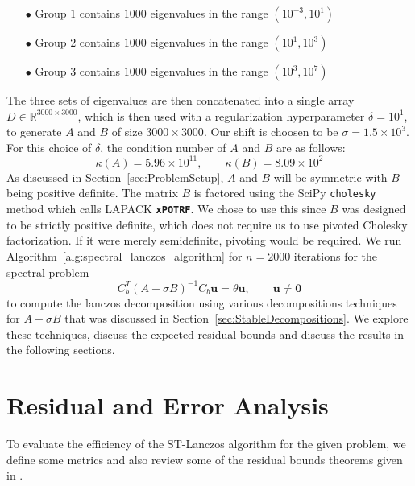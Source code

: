 \begin{itemize}
    \item[$\bullet$] Group $1$ contains $1000$ eigenvalues in the range $(10^{-3}, 10^{1})$
    \item[$\bullet$] Group $2$ contains $1000$ eigenvalues in the range $(10^1, 10^3)$
    \item[$\bullet$] Group $3$ contains $1000$ eigenvalues in the range $(10^3, 10^7)$
\end{itemize}

The three sets of eigenvalues are then concatenated into a single array $D \in \mathbb{R}^{3000 \times 3000}$, which is then used with a regularization hyperparameter $\delta = 10^{1}$, to generate $A$ and $B$ of size $3000 \times 3000$. Our shift is choosen to be $\sigma = 1.5 \times 10^3$. For this choice of $\delta$, the condition number of $A$ and $B$ are as follows:
\begin{equation*}
    \kappa(A) = 5.96 \times 10^{11}, \qquad \kappa(B) = 8.09 \times 10^2
\end{equation*}
As discussed in Section~\ref{sec:ProblemSetup}, $A$ and $B$ will be symmetric with $B$ being positive definite. The matrix $B$ is factored using the SciPy \texttt{cholesky} method which calls LAPACK \textbf{\texttt{xPOTRF}}. We chose to use this since $B$ was designed to be strictly positive definite, which does not require us to use  pivoted Cholesky factorization. If it were merely semidefinite, pivoting would be required. We run Algorithm~\ref{alg:spectral_lanczos_algorithm} for $n=2000$ iterations for the spectral problem
\begin{equation}\label{eq:ShiftedInvertedProblem2}
	C_b^T (A-\sigma B)^{-1} C_b \mathbf{u} = \theta \mathbf{u}, \qquad \mathbf{u} \neq \mathbf{0}
\end{equation}
to compute the lanczos decomposition using various decompositions techniques for $A - \sigma B$ that was discussed in Section~\ref{sec:StableDecompositions}. We explore these techniques, discuss the expected residual bounds and discuss the results in the following sections.

\section{Residual and Error Analysis}

To evaluate the efficiency of the ST-Lanczos algorithm for the given problem, we define some metrics and also review some of the residual bounds theorems given in \cite{stewart2024spectraltransformationdensesymmetric}.

